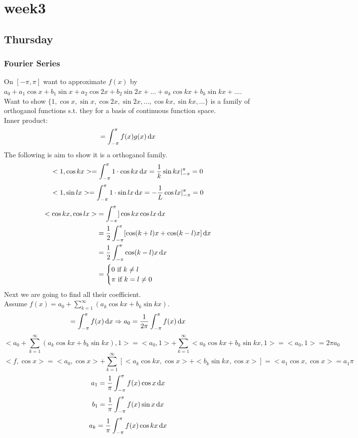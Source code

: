 

\chapter{week3}

\section{Thursday}
\subsection{Fourier Series}
On $[-\pi,\pi]$ want to approximate $f(x)$ by $a_0+a_1\cos x+b_1\sin x+a_2\cos 2x+b_2\sin 2x+\dots+a_k\cos kx+b_k \sin kx+\dots$.\\
Want to show $\{1,\cos x,\sin x,\cos 2x,\sin 2x,\dots,\cos kx,\sin kx,\dots\}$ is a family of orthoganol functions s.t. they for a basis of continuous function space.\\
Inner product:
\[<f,g>=\int_{-\pi}^{\pi}f(x)g(x)\diff x
\]
The following is aim to show it is a orthoganol family.\\
\[<1,\cos kx>=\int_{-\pi}^\pi 1\cdot\cos kx \,\mathrm{d} x=\frac{1}{k}\sin kx|_{-\pi}^\pi=0
\]
\[<1,\sin lx>=\int_{-\pi}^\pi 1\cdot \sin lx\,\mathrm{d} x=-\frac{1}{L}\cos lx|_{-\pi}^\pi=0
\]
\[\begin{aligned}<\cos kx,\cos lx>&=\int_{-\pi}^\pi]\cos kx\cos lx\,\mathrm{d} x\\
&=\frac{1}{2}\int_{-\pi}^\pi[\cos(k+l)x+\cos(k-l)x]\,\mathrm{d} x\\
&=\frac{1}{2}\int_{-\pi}^\pi \cos(k-l)x\,\mathrm{d} x\\
&=\begin{cases}0 \text{ if } k\neq l\\\pi \text{ if } k=l\neq0\end{cases}
\end{aligned}
\]
Next we are going to find all their coefficient.\\
Assume $f(x)=a_0+\sum_{k=1}^\infty(a_k\cos kx+b_k\sin kx)$.
\[<f,1>=\int_{-\pi}^\pi f(x)\diff x\Rightarrow a_0=\frac{1}{2\pi}\int_{-\pi}^\pi f(x)\diff x
\]
\[<a_0+\sum_{k=1}^{\infty}(a_k\cos kx+b_k\sin kx),1>=<a_0,1>+\sum_{k=1}^{\infty}<a_k\cos kx+b_k\sin kx,1>=<a_0,1>=2\pi a_0
\]
\[<f,\cos x>=<a_0,\cos x>+\sum_{k=1}^\infty[<a_k\cos kx,\cos x>+<b_k\sin kx,\cos x>]=<a_1\cos x,\cos x>=a_1\pi
\]
\[a_1=\frac{1}{\pi}\int_{-\pi}^\pi f(x)\cos x\,\mathrm{d} x
\]
\[b_1=\frac{1}{\pi}\int_{-\pi}^\pi f(x)\sin x\,\mathrm{d} x
\]
\[a_k=\frac{1}{\pi}\int_{-\pi}^\pi f(x)\cos kx\,\mathrm{d} x
\]
